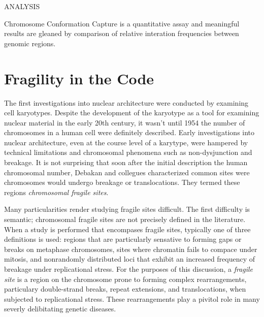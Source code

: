\documentclass[phd,tocprelim]{cornell}
\begin{document}
ANALYSIS

Chromosome Conformation Capture is a quantitative assay and meaningful
results are gleaned by comparison of relative interation frequencies
between genomic regions. %




















\chapter{Fragility in the Code}

The first investigations into nuclear architecture were conducted by
examining cell karyotypes.  Despite the development of the karyotype as a
tool for examining nuclear material in the early 20th
century\cite{levitsky1924}, it wasn't until 1954 the number of chromosomes in
a human cell were definitely described\cite{tjio1956}.  Early investigations
into nuclear architecture, even at the course level of a karytype, were
hampered by technical limitations and chromosomal phenomena such as
non-dysjunction and breakage.  It is not surprising that soon after the
initial description the human chromosomal number, Debakan and collegues
characterized common sites were chromosomes would undergo breakage or
translocations.  They termed these regions
\textit{chromosomal fragile sites}\cite{leyden2008}.

Many particularities render studying fragile sites difficult.  The
first difficulty is semantic; chromosomal fragile sites are not precisely
defined in the literature.  When a study is performed that encompases fragile
sites, typically one of three definitions is used: regions that are particularly
sensative to forming gaps or breaks on metaphase chromosomes\cite{glover2005},
sites where chromatin fails to compace under mitosis\cite{leyden2008}, and
nonrandomly distributed loci that exhibit an increased frequency of breakage
under replicational stress\cite{franchitto2013}.  For the purposes of this
discussion, a \textit{fragile site} is a region on the chromosome prone to
forming complex rearrangements, particulary double-strand breaks, repeat
extensions, and translocations, when subjected to replicational stress.  These
rearrangements play a pivitol role in many severly delibitating genetic
diseases.
\end{document}
